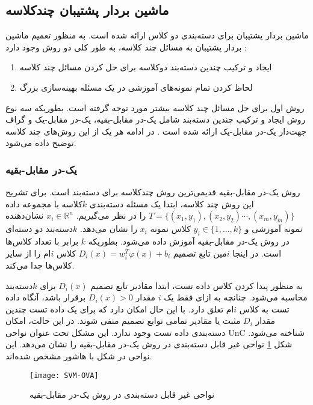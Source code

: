 \subsection{ماشین بردار پشتیبان چندکلاسه}\label{sec:2:1:5}
ماشین بردار پشتیبان برای دسته‌بندی دو کلاس ارائه شده است. به منظور تعمیم ماشین بردار پشتیبان به مسائل چند کلاسه، به طور کلی دو روش وجود دارد \cite{hsu2002}:
\begin{enumerate}
	\item  ایجاد و ترکیب چندین دسته‌بند دوکلاسه برای حل کردن مسائل چند کلاسه
	\item لحاظ کردن تمام نمونه‌های آموزشی در یک مسئله بهینه‌سازی بزرگ
\end{enumerate}

روش اول برای حل مسائل چند کلاسه بیشتر مورد توجه گرفته است. بطوریکه سه نوع روش ایجاد و ترکیب چندین دسته‌بند شامل یک-در مقابل-بقیه، یک-در مقابل-یک و گراف جهت‌دار یک-در مقابل-یک ارائه شده است \cite{hsu2002, shigeo2005}. در ادامه هر یک از این روش‌های چند کلاسه توضیح داده می‌شود.
\subsubsection{یک-در مقابل-بقیه}\label{sec:2:1:5:1}
 روش یک-در مقابل-بقیه قدیمی‌ترین روش چندکلاسه برای دسته‌بند  است. برای تشریح این روش چند کلاسه، ابتدا یک مسئله دسته‌بندی $k$کلاسه با مجموعه داده $T=\{(x_1, y_1),(x_2, y_2) \cdots , (x_m, y_m)\}$ را در نظر می‌گیریم. $x_{i} \in \mathbb{R}^{n}$  نشان‌دهنده نمونه آموزشی و $y_i \in \{1,\dots, k\}$ کلاس نمونه $x_{i}$ را نشان می‌دهد. $k$دسته‌بند  دو دسته‌ای در روش یک-در مقابل-بقیه آموزش داده می‌شود. بطوریکه $k$ برابر با تعداد کلاس‌ها است. در اینجا $i$مین تابع تصمیم $D_{i}(x) = w^{T}_{i}\varphi(x) + b_{i}$ کلاس $i$ام را از سایر کلاس‌ها جدا می‌کند.
 
به منظور پیدا کردن کلاس داده تست، ابتدا مقادیر تابع تصمیم $D_{i}(x)$ برای $k$دسته‌بند محاسبه می‌شود. چنانچه به ازای فقط یک  $i$ مقدار $D_{i}(x) > 0$ برقرار باشد، آنگاه داده تست به کلاس $i$ام تعلق دارد. با این حال امکان دارد که برای یک داده تست چندین مقدار $D_{i}$ مثبت یا مقادیر تمامی توابع تصمیم منفی شوند. در این حالت، امکان دسته‌بندی داده تست وجود ندارد. این مشکل تحت عنوان نواحی \gls{UnC} شناخته می‌شود. شکل \ref{fig:SVM-OVA} نواحی غیر قابل دسته‌بندی در روش یک-در مقابل-بقیه را نشان می‌دهد. این نواحی در شکل با هاشور مشخص شده‌اند.

\begin{figure}[!t]
	\centering
	\texttt{[image: SVM-OVA]}
	\caption[نواحی غیر قابل دسته‌بندی در روش یک-در مقابل-بقیه]{نواحی غیر قابل دسته‌بندی در روش یک-در مقابل-بقیه \cite{shigeo2005}}
	\label{fig:SVM-OVA}
\end{figure}

